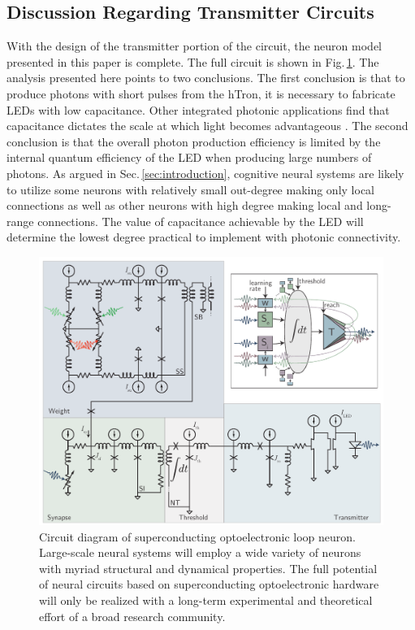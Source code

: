 \documentclass[twocolumn]{article}
\begin{document}
\subsection{\label{sec:discussion_transmitterCircuits}Discussion Regarding Transmitter Circuits}
With the design of the transmitter portion of the circuit, the neuron model presented in this paper is complete. The full circuit is shown in Fig.\,\ref{fig:transmitters_fullCircuit}. The analysis presented here points to two conclusions. The first conclusion is that to produce photons with short pulses from the hTron, it is necessary to fabricate LEDs with low capacitance. Other integrated photonic applications find that capacitance dictates the scale at which light becomes advantageous \cite{mi2017}. The second conclusion is that the overall photon production efficiency is limited by the internal quantum efficiency of the LED when producing large numbers of photons. As argued in Sec.\,\ref{sec:introduction}, cognitive neural systems are likely to utilize some neurons with relatively small out-degree making only local connections as well as other neurons with high degree making local and long-range connections. The value of capacitance achievable by the LED will determine the lowest degree practical to implement with photonic connectivity.
\begin{figure}[t!]
	\centerline{\includegraphics[width=17.2cm]{_transmitters_fullCircuit_small.pdf}}
	\caption{\label{fig:transmitters_fullCircuit}Circuit diagram of superconducting optoelectronic loop neuron. Large-scale neural systems will employ a wide variety of neurons with myriad structural and dynamical properties. The full potential of neural circuits based on superconducting optoelectronic hardware will only be realized with a long-term experimental and theoretical effort of a broad research community.}
\end{figure}
\end{document}
